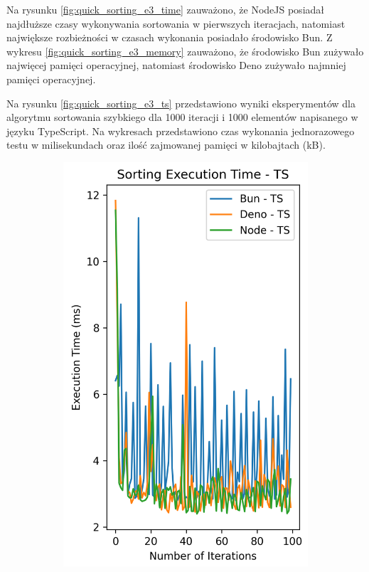 Na rysunku \ref{fig:quick_sorting_e3_time} zauważono, że NodeJS posiadał najdłuższe czasy wykonywania sortowania w pierwszych iteracjach, natomiast największe rozbieżności w czasach wykonania posiadało środowisko Bun. Z wykresu \ref{fig:quick_sorting_e3_memory} zauważono, że środowisko Bun zużywało najwięcej pamięci operacyjnej, natomiast środowisko Deno zużywało najmniej pamięci operacyjnej.

Na rysunku \ref{fig:quick_sorting_e3_ts} przedstawiono wyniki eksperymentów dla algorytmu sortowania szybkiego dla 1000 iteracji i 1000 elementów napisanego w języku TypeScript. Na wykresach przedstawiono czas wykonania jednorazowego testu w milisekundach oraz ilość zajmowanej pamięci w kilobajtach (kB).

\begin{figure}[H]
  \centering
  \begin{subfigure}[b]{0.44\textwidth}
    \centering
    \includegraphics[width=\textwidth]{Figures/sorting/sorting_quick_100_10000_ts_time.png}

\end{subfigure}
\end{figure}
